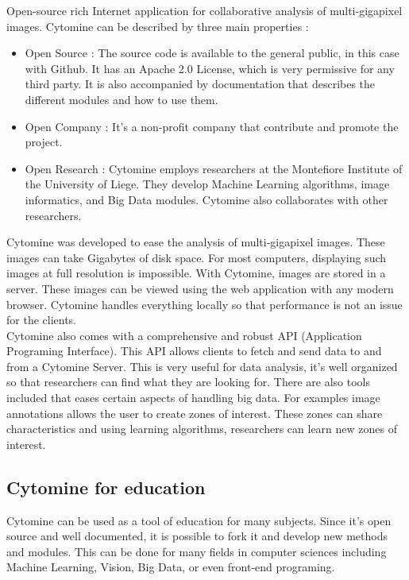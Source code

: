 \documentclass[a4paper,11pt]{report}
\numberwithin{figure}{section} %
\begin{document}
Open-source rich Internet application for collaborative analysis of multi-gigapixel images.
Cytomine can be described by three main properties :
\begin{itemize}
\item[\textbullet] Open Source : The source code is available to the general public, in this case with Github.
It has an Apache 2.0 License, which is very permissive for any third party.
It is also accompanied by documentation that describes the different modules and how to use them.
\item[\textbullet] Open Company : It's a non-profit company that contribute and promote the project.
\item[\textbullet] Open Research : Cytomine employs researchers at the Montefiore Institute of the University of Liege.
They develop Machine Learning algorithms, image informatics, and Big Data modules.
Cytomine also collaborates with other researchers.
\end{itemize}

Cytomine was developed to ease the analysis of multi-gigapixel images.
These images can take Gigabytes of disk space.
For most computers, displaying such images at full resolution is impossible.
With Cytomine, images are stored in a server.
These images can be viewed using the web application with any modern browser.
Cytomine handles everything locally so that performance is not an issue for the clients.\\

	Cytomine also comes with a comprehensive and robust API (Application Programing Interface).
	This API allows clients to fetch and send data to and from a Cytomine Server.
	This is very useful for data analysis, it's well organized so that researchers can find what they are looking for.
	There are also tools included that eases certain aspects of handling big data.
	For examples image annotations allows the user to create zones of interest.
	These zones can share characteristics and using learning algorithms, researchers can learn new zones of interest.

\subsection{Cytomine for education}

Cytomine can be used as a tool of education for many subjects.
Since it's open source and well documented, it is possible to fork it and develop new methods and modules.
This can be done for many fields in computer sciences including Machine Learning, Vision, Big Data, or even front-end programing.\\
\end{document}
